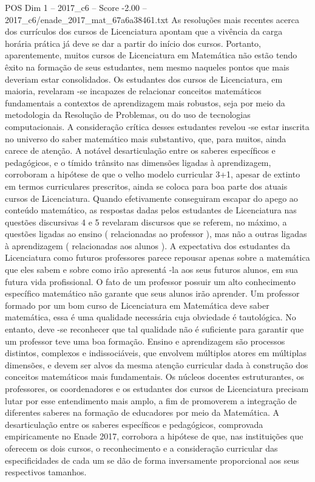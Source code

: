 \begin{textsample}{POS Dim 1 – 2017\_c6 – Score -2.00 – 2017\_c6/enade\_2017\_mat\_67a6a38461.txt}
As resoluções mais recentes acerca dos currículos dos cursos de Licenciatura apontam que a vivência da carga horária prática já deve se dar a partir do início dos cursos.
Portanto, aparentemente, muitos cursos de Licenciatura em Matemática não estão tendo êxito na formação de seus estudantes, nem mesmo naqueles pontos que mais deveriam estar consolidados.
Os estudantes dos cursos de Licenciatura, em maioria, revelaram -se incapazes de relacionar conceitos matemáticos fundamentais a contextos de aprendizagem mais robustos, seja por meio da metodologia da Resolução de Problemas, ou do uso de tecnologias computacionais.
A consideração crítica desses estudantes revelou -se estar inscrita no universo do saber matemático mais substantivo, que, para muitos, ainda carece de atenção.
A notável desarticulação entre os saberes específicos e pedagógicos, e o tímido trânsito nas dimensões ligadas à aprendizagem, corroboram a hipótese de que o velho modelo curricular 3+1, apesar de extinto em termos curriculares prescritos, ainda se coloca para boa parte dos atuais cursos de Licenciatura.
Quando efetivamente conseguiram escapar do apego ao conteúdo matemático, as respostas dadas pelos estudantes de Licenciatura nas questões discursivas 4 e 5 revelaram discursos que se referem, no máximo, a questões ligadas ao ensino ( relacionadas ao professor ), mas não a outras ligadas à aprendizagem ( relacionadas aos alunos ).
A expectativa dos estudantes da Licenciatura como futuros professores parece repousar apenas sobre a matemática que eles sabem e sobre como irão apresentá -la aos seus futuros alunos, em sua futura vida profissional.
O fato de um professor possuir um alto conhecimento específico matemático não garante que seus alunos irão aprender.
Um professor formado por um bom curso de Licenciatura em Matemática deve saber matemática, essa é uma qualidade necessária cuja obviedade é tautológica.
No entanto, deve -se reconhecer que tal qualidade não é suficiente para garantir que um professor teve uma boa formação.
Ensino e aprendizagem são processos distintos, complexos e indissociáveis, que envolvem múltiplos atores em múltiplas dimensões, e devem ser alvos da mesma atenção curricular dada à construção dos conceitos matemáticos mais fundamentais.
Os núcleos docentes estruturantes, os professores, os coordenadores e os estudantes dos cursos de Licenciatura precisam lutar por esse entendimento mais amplo, a fim de promoverem a integração de diferentes saberes na formação de educadores por meio da Matemática.
A desarticulação entre os saberes específicos e pedagógicos, comprovada empiricamente no Enade 2017, corrobora a hipótese de que, nas instituições que oferecem os dois cursos, o reconhecimento e a consideração curricular das especificidades de cada um se dão de forma inversamente proporcional aos seus respectivos tamanhos.

\end{textsample}
